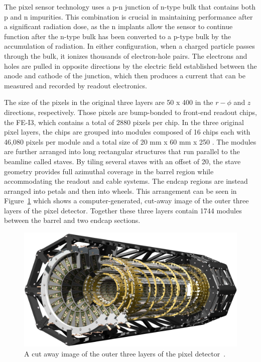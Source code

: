 The pixel sensor technology uses a p-n junction of n-type bulk that contains both p\tsup{+} and n\tsup{+} impurities.
This combination is crucial in maintaining performance after a significant radiation dose, as the n\tsup{+} implants allow the sensor to continue function after the n-type bulk has been converted to a p-type bulk by the accumulation of radiation.
In either configuration, when a charged particle passes through the bulk, it ionizes thousands of electron-hole pairs. 
The electrons and holes are pulled in opposite directions by the electric field established between the anode and cathode of the junction, which then produces a current that can be measured and recorded by readout electronics.

The size of the pixels in the original three layers are 50 \um x 400 \um in the $r-\phi$ and $z$ directions, respectively.
Those pixels are bump-bonded to front-end readout chips, the FE-I3, which contains a total of 2880 pixels per chip. 
In the three original pixel layers, the chips are grouped into modules composed of 16 chips each with 46,080 pixels per module and a total size of 20 mm x 60 mm x 250 \um. 
The modules are further arranged into long rectangular structures that run parallel to the beamline called staves.
By tiling several staves with an offset of 20\textdegree, the stave geometry provides full azimuthal coverage in the barrel region while accommodating the readout and cable systems.
The endcap regions are instead arranged into petals and then into wheels. 
This arrangement can be seen in Figure~\ref{fig:pixel_overview} which shows a computer-generated, cut-away image of the outer three layers of the pixel detector.
Together these three layers contain 1744 modules between the barrel and two endcap sections.

\begin{figure}[hbtp]
\includegraphics[width=\fullfig]{figures/pixel_overview.pdf}
\caption{A cut away image of the outer three layers of the pixel detector~\cite{atlas_experiment}.}
\label{fig:pixel_overview}
\end{figure}

